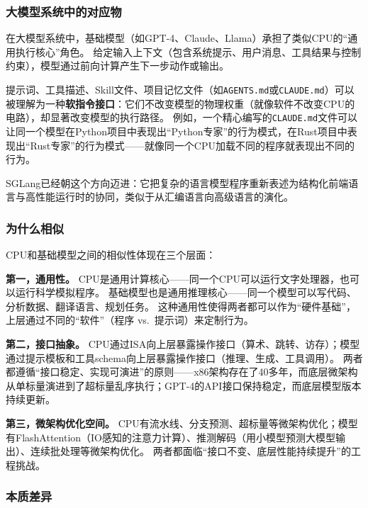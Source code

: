 \subsubsection{大模型系统中的对应物}

在大模型系统中，基础模型（如GPT-4、Claude、Llama）承担了类似CPU的``通用执行核心''角色。
给定输入上下文（包含系统提示、用户消息、工具结果与控制约束），模型通过前向计算产生下一步动作或输出\cite{vaswani2017attention,brown2020gpt3,llama2023}。

提示词、工具描述、Skill文件、项目记忆文件（如\texttt{AGENTS.md}或\texttt{CLAUDE.md}）可以被理解为一种\textbf{软指令接口}：它们不改变模型的物理权重（就像软件不改变CPU的电路），却显著改变模型的执行路径\cite{openai_codex_agents_md_2026,openai_codex_skills_2026,anthropic_claudecode_memory_2026}。
例如，一个精心编写的\texttt{CLAUDE.md}文件可以让同一个模型在Python项目中表现出``Python专家''的行为模式，在Rust项目中表现出``Rust专家''的行为模式——就像同一个CPU加载不同的程序就表现出不同的行为。

SGLang已经朝这个方向迈进：它把复杂的语言模型程序重新表述为结构化前端语言与高性能运行时的协同，类似于从汇编语言向高级语言的演化\cite{sglang2024,sglang_docs_2026}。

\subsubsection{为什么相似}

CPU和基础模型之间的相似性体现在三个层面：

\textbf{第一，通用性。}
CPU是通用计算核心——同一个CPU可以运行文字处理器，也可以运行科学模拟程序。
基础模型也是通用推理核心——同一个模型可以写代码、分析数据、翻译语言、规划任务。
这种通用性使得两者都可以作为``硬件基础''，上层通过不同的``软件''（程序 vs.\ 提示词）来定制行为。

\textbf{第二，接口抽象。}
CPU通过ISA向上层暴露操作接口（算术、跳转、访存）；模型通过提示模板和工具schema向上层暴露操作接口（推理、生成、工具调用）。
两者都遵循``接口稳定、实现可演进''的原则——x86架构存在了40多年，而底层微架构从单标量演进到了超标量乱序执行；GPT-4的API接口保持稳定，而底层模型版本持续更新。

\textbf{第三，微架构优化空间。}
CPU有流水线、分支预测、超标量等微架构优化；模型有FlashAttention（IO感知的注意力计算\cite{dao2022flashattention}）、推测解码（用小模型预测大模型输出\cite{leviathan2023speculative}）、连续批处理等微架构优化。
两者都面临``接口不变、底层性能持续提升''的工程挑战。

\subsubsection{本质差异}

